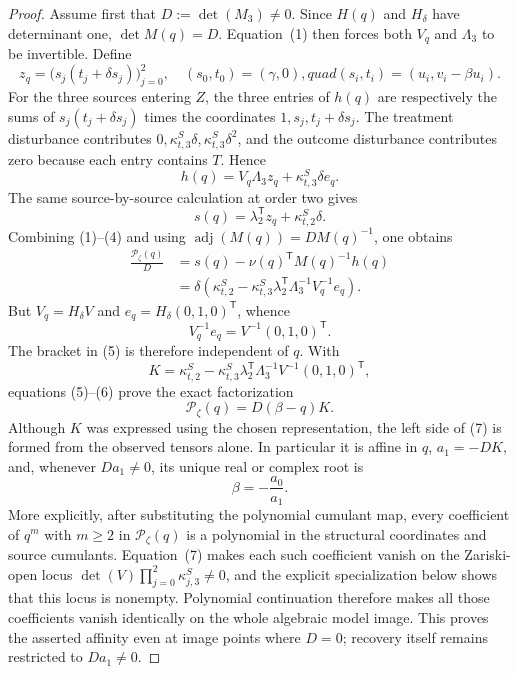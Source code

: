\documentclass{article}
\begin{document}
\begin{proof}
Assume first that \(D:=\det(M_3)\ne0\).  Since \(H(q)\) and \(H_\delta\) have determinant one, \(\det M(q)=D\).  Equation~(1) then forces both \(V_q\) and \(\Lambda_3\) to be invertible.  Define
\[
 z_q=\bigl(s_j(t_j+\delta s_j)\bigr)_{j=0}^2,
 \quad (s_0,t_0)=(\gamma,0),quad
 (s_i,t_i)=(u_i,v_i-\beta u_i).
\]
For the three sources entering \(Z\), the three entries of \(h(q)\) are respectively the sums of \(s_j(t_j+\delta s_j)\) times the coordinates \(1,s_j,t_j+\delta s_j\).  The treatment disturbance contributes \(0,\kappa^S_{t,3}\delta,\kappa^S_{t,3}\delta^2\), and the outcome disturbance contributes zero because each entry contains \(T\).  Hence
\[
 h(q)=V_q\Lambda_3z_q+\kappa^S_{t,3}\delta e_q. \tag{3}
\]
The same source-by-source calculation at order two gives
\[
 s(q)=\lambda_2^{\mathsf T}z_q+\kappa^S_{t,2}\delta. \tag{4}
\]
Combining (1)--(4) and using \(\operatorname{adj}(M(q))=D M(q)^{-1}\), one obtains
\[
 \begin{aligned}
 \frac{\mathcal P_\zeta(q)}{D}
 &=s(q)-\nu(q)^{\mathsf T}M(q)^{-1}h(q)\\
 &=\delta\left(\kappa^S_{t,2}-\kappa^S_{t,3}
 \lambda_2^{\mathsf T}\Lambda_3^{-1}V_q^{-1}e_q\right).
 \end{aligned} \tag{5}
\]
But \(V_q=H_\delta V\) and \(e_q=H_\delta(0,1,0)^{\mathsf T}\), whence
\[
 V_q^{-1}e_q=V^{-1}(0,1,0)^{\mathsf T}. \tag{6}
\]
The bracket in (5) is therefore independent of \(q\).  With
\[
 K=\kappa^S_{t,2}-\kappa^S_{t,3}\lambda_2^{\mathsf T}
 \Lambda_3^{-1}V^{-1}(0,1,0)^{\mathsf T},
\]
equations (5)--(6) prove the exact factorization
\[
 \mathcal P_\zeta(q)=D(\beta-q)K. \tag{7}
\]
Although \(K\) was expressed using the chosen representation, the left side of (7) is formed from the observed tensors alone.  In particular it is affine in \(q\), \(a_1=-DK\), and, whenever \(Da_1\ne0\), its unique real or complex root is
\[
 \beta=-\frac{a_0}{a_1}. \tag{8}
\]
More explicitly, after substituting the polynomial cumulant map, every coefficient of \(q^m\) with \(m\ge2\) in \(\mathcal P_\zeta(q)\) is a polynomial in the structural coordinates and source cumulants.  Equation~(7) makes each such coefficient vanish on the Zariski-open locus \(\det(V)\prod_{j=0}^2\kappa^S_{j,3}\ne0\), and the explicit specialization below shows that this locus is nonempty.  Polynomial continuation therefore makes all those coefficients vanish identically on the whole algebraic model image.  This proves the asserted affinity even at image points where \(D=0\); recovery itself remains restricted to \(Da_1\ne0\).


\end{proof}
\end{document}
